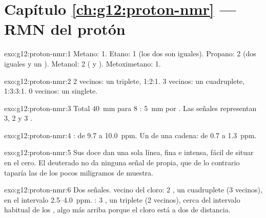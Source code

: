 \section*{Capítulo \ref{ch:g12:proton-nmr} --- RMN del protón}

\begin{solution}{exo:g12:proton-nmr:1}
Metano: 1. Etano: 1 (los dos  son iguales). Propano: 2 (dos
 iguales y un ). Metanol: 2 ( y ).
Metoximetano: 1.
\end{solution}

\begin{solution}{exo:g12:proton-nmr:2}
2 vecinos: un triplete, 1:2:1. 3 vecinos: un cuadruplete, 1:3:3:1.
0 vecinos: un singlete.
\end{solution}

\begin{solution}{exo:g12:proton-nmr:3}
Total \qty{40}{mm} para 8 : \qty{5}{mm} por . Las señales
representan 3, 2 y 3 .
\end{solution}

\begin{solution}{exo:g12:proton-nmr:4}
: de 9.7 a \qty{10.0}{ppm}. Un  de una cadena: de 0.7 a
\qty{1.3}{ppm}.
\end{solution}

\begin{solution}{exo:g12:proton-nmr:5}
Sus doce  dan una sola línea, fina e intensa, fácil
de situar en el cero. El  deuterado no da ninguna señal de
 propia, que de lo contrario taparía las de los pocos miligramos
de muestra.
\end{solution}

\begin{solution}{exo:g12:proton-nmr:6}
Dos señales.  vecino del cloro: 2 , un cuadruplete (3
vecinos), en el intervalo 2.5--\qty{4.0}{ppm}. : 3 , un
triplete (2 vecinos), cerca del intervalo habitual de los , algo
más arriba porque el cloro está a dos  de distancia.
\end{solution}

